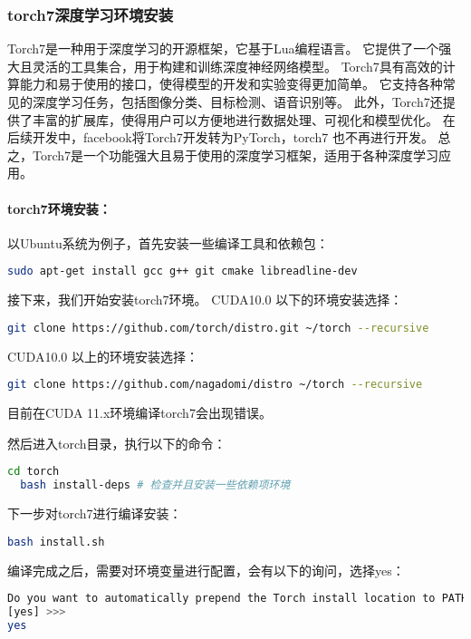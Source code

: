\documentclass[lang=cn,a4paper,newtx]{elegantpaper}
\begin{document}
\subsubsection{torch7深度学习环境安装}
Torch7是一种用于深度学习的开源框架，它基于Lua编程语言。
它提供了一个强大且灵活的工具集合，用于构建和训练深度神经网络模型。
Torch7具有高效的计算能力和易于使用的接口，使得模型的开发和实验变得更加简单。
它支持各种常见的深度学习任务，包括图像分类、目标检测、语音识别等。
此外，Torch7还提供了丰富的扩展库，使得用户可以方便地进行数据处理、可视化和模型优化。
在后续开发中，facebook将Torch7开发转为PyTorch，torch7 也不再进行开发。
总之，Torch7是一个功能强大且易于使用的深度学习框架，适用于各种深度学习应用。
\paragraph{torch7环境安装：}
以Ubuntu系统为例子，首先安装一些编译工具和依赖包：
\begin{lstlisting}[language=bash]
sudo apt-get install gcc g++ git cmake libreadline-dev 
\end{lstlisting}

接下来，我们开始安装torch7环境。
CUDA10.0 以下的环境安装选择：
\begin{lstlisting}[language=bash]
  git clone https://github.com/torch/distro.git ~/torch --recursive
\end{lstlisting}

CUDA10.0 以上的环境安装选择：
\begin{lstlisting}[language=bash]
  git clone https://github.com/nagadomi/distro ~/torch --recursive
\end{lstlisting}

目前在CUDA 11.x环境编译torch7会出现错误。

然后进入torch目录，执行以下的命令：
\begin{lstlisting}[language=bash]
  cd torch
  bash install-deps # 检查并且安装一些依赖项环境
\end{lstlisting}

下一步对torch7进行编译安装：
\begin{lstlisting}[language=bash]
  bash install.sh
\end{lstlisting}

编译完成之后，需要对环境变量进行配置，会有以下的询问，选择yes：
\begin{lstlisting}[language=bash]
Do you want to automatically prepend the Torch install location to PATH and LD_LIBRARY in your /home/asus/.bashrc?(yes/no)
[yes] >>>
yes
\end{lstlisting}
\end{document}
